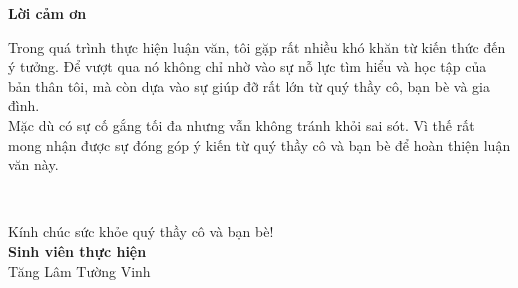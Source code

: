 \vspace*{2cm}

\begin{center}
	\LARGE{\textbf{Lời cảm ơn}}
\end{center}
\vspace*{1cm}
Trong quá trình thực hiện luận văn, tôi gặp rất nhiều khó khăn từ kiến thức đến ý tưởng. Để vượt qua nó không chỉ nhờ vào sự nỗ lực tìm hiểu và học tập của bản thân tôi, mà còn dựa vào sự giúp đỡ rất lớn từ quý thầy cô, bạn bè và gia đình.
\vspace*{0.6cm}\\
Mặc dù có sự cố gắng tối đa nhưng vẫn không tránh khỏi sai sót. Vì thế rất mong nhận được sự đóng góp ý kiến từ quý thầy cô và bạn bè để hoàn thiện luận văn này.
\vspace*{1cm}\\
\begin{minipage}{0.45\textwidth}
	\begin{flushleft}
		~
	\end{flushleft}
\end{minipage}
\begin{minipage}{0.56\textwidth}
	\begin{center}
		Kính chúc sức khỏe quý thầy cô và bạn bè!\\
		\textbf{Sinh viên thực hiện}\\[2cm]
		Tăng Lâm Tường Vinh
	\end{center}
\end{minipage}
\thispagestyle{empty}